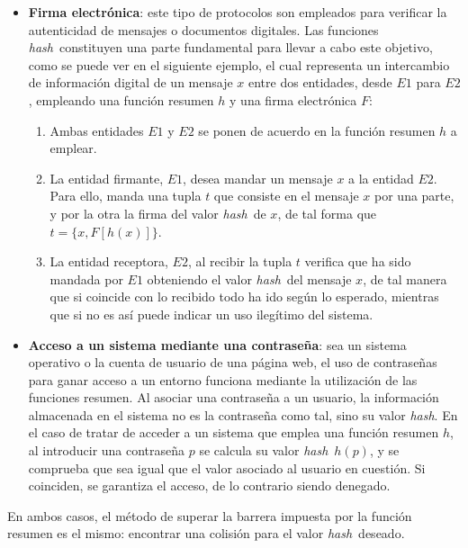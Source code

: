 \documentclass[12pt,spanish,listoffigures,listoftables,listofalgorithms]{tfgetsinf}
\newcommand{\hash}{\textit{hash}}
\begin{document}
\begin{itemize}
		
	\item \textbf{Firma electrónica}: este tipo de protocolos son empleados  para verificar la autenticidad de mensajes o documentos digitales. Las funciones \hash~constituyen una parte fundamental para llevar a cabo este objetivo, como se puede ver en el siguiente ejemplo, el cual representa un intercambio de información digital de un mensaje $x$ entre dos entidades, desde $E1$ para $E2$, empleando una función resumen $h$ y una firma electrónica $F$:

		\begin{enumerate}
				
			\item Ambas entidades $E1$ y $E2$ se ponen de acuerdo en la función resumen $h$ a emplear.

			\item La entidad firmante, $E1$, desea mandar un mensaje $x$ a la entidad $E2$. Para ello, manda una tupla $t$ que consiste en el mensaje $x$ por una parte, y por la otra la firma del valor \hash~de $x$, de tal forma que $t = \{x, F[h(x)]\}$.

			\item La entidad receptora, $E2$, al recibir la tupla $t$ verifica que ha sido mandada por $E1$ obteniendo el valor \hash~del mensaje $x$, de tal manera que si coincide con lo recibido todo ha ido según lo esperado, mientras que si no es así puede indicar un uso ilegítimo del sistema.

		\end{enumerate}

	\item \textbf{Acceso a un sistema mediante una contraseña}: sea un sistema operativo o la cuenta de usuario de una página web, el uso de contraseñas para ganar acceso a un entorno funciona mediante la utilización de las funciones resumen. Al asociar una contraseña a un usuario, la información almacenada en el sistema no es la contraseña como tal, sino su valor \hash. En el caso de tratar de acceder a un sistema que emplea una función resumen $h$, al introducir una contraseña $p$ se calcula su valor \hash~$h(p)$, y se comprueba que sea igual que el valor asociado al usuario en cuestión. Si coinciden, se garantiza el acceso, de lo contrario siendo denegado.

\end{itemize}

En ambos casos, el método de superar la barrera impuesta por la función resumen es el mismo: encontrar una colisión para el valor \hash~deseado.
\end{document}
